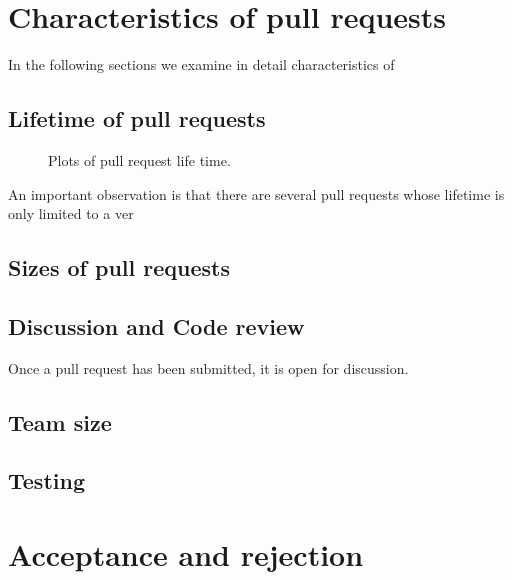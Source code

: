 \documentclass{sig-alternate}
\begin{document}
\section{Characteristics of pull requests}

In the following sections we examine in detail characteristics of 

\subsection{Lifetime of pull requests}

\begin{figure*}
\centering
{}
\caption{Plots of pull request life time.}
\end{figure*}


An important observation is that there are several pull requests whose
lifetime is only limited to a ver

\subsection{Sizes of pull requests}



\subsection{Discussion and Code review}

Once a pull request has been submitted, it is open for discussion.

\subsection{Team size}

\subsection{Testing}

\section{Acceptance and rejection}
\label{sec:accrej}
\end{document}
